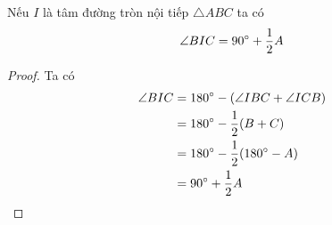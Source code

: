 \begin{lemma}
Nếu $I$ là tâm đường tròn nội tiếp $\triangle ABC$ ta có
\[
	\angle BIC = 90 \degree + \frac{1}{2}A
\]
\end{lemma}

\begin{center}

\end{center}

\begin{proof}
	Ta có 
	\begin{align*}
		\angle BIC &= 180 \degree - (\angle IBC + \angle ICB) \\ 
				   &= 180 \degree - \frac{1}{2}(B + C) \\ 
				   &= 180 \degree - \frac{1}{2}(180 \degree - A) \\
				   &= 90 \degree + \frac{1}{2}A
	\end{align*}
\end{proof}